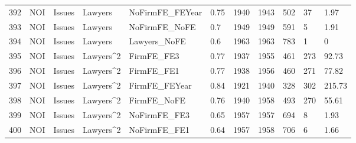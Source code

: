 \documentclass{article}
\begin{document}
\begin{table}[H]
\begin{tabular}{rllllllllll}
  392 & NOI & Issues & Lawyers & NoFirmFE\_FEYear & 0.75 & 1940 & 1943 & 502 & 37 & 1.97 \\ 
  393 & NOI & Issues & Lawyers & NoFirmFE\_NoFE & 0.7 & 1949 & 1949 & 591 & 5 & 1.91 \\ 
  394 & NOI & Issues & Lawyers & Lawyers\_NoFE & 0.6 & 1963 & 1963 & 783 & 1 & 0 \\ 
  395 & NOI & Issues & Lawyers^2 & FirmFE\_FE3 & 0.77 & 1937 & 1955 & 461 & 273 & 92.73 \\ 
  396 & NOI & Issues & Lawyers^2 & FirmFE\_FE1 & 0.77 & 1938 & 1956 & 460 & 271 & 77.82 \\ 
  397 & NOI & Issues & Lawyers^2 & FirmFE\_FEYear & 0.84 & 1921 & 1940 & 328 & 302 & 215.73 \\ 
  398 & NOI & Issues & Lawyers^2 & FirmFE\_NoFE & 0.76 & 1940 & 1958 & 493 & 270 & 55.61 \\ 
  399 & NOI & Issues & Lawyers^2 & NoFirmFE\_FE3 & 0.65 & 1957 & 1957 & 694 & 8 & 1.93 \\ 
  400 & NOI & Issues & Lawyers^2 & NoFirmFE\_FE1 & 0.64 & 1957 & 1958 & 706 & 6 & 1.66 \\ 
   \hline
\end{tabular}
\end{table}
\end{document}
